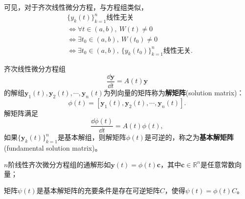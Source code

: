 可见，对于齐次线性微分方程，与方程组类似，
\begin{align}
    &\{y_k(t)\}_{k=1}^n\text{线性无关}\nonumber\\
    &\iff \forall t\in(a,b),\ W(t)\neq 0\nonumber\\
    &\iff \exists t_0\in(a,b),\ W(t_0)\neq 0\nonumber\\
    &\iff \exists t_0\in(a,b),\ \{y_k(t_0)\}_{k=1}^n\text{线性无关}.
\end{align}

\begin{definition}[解矩阵]
    齐次线性微分方程组
    \begin{equation}
        \frac{\dd\mathbf{y}}{\dd t}=A(t)\mathbf{y}
    \end{equation}
    的解组$\mathbf{y}_1(t),\mathbf{y}_2(t),\cdots,\mathbf{y}_n(t)$为列向量的矩阵称为\textbf{解矩阵}(solution matrix)：
    \begin{equation}
        \phi(t)=[\mathbf{y}_1(t),\mathbf{y}_2(t),\cdots,\mathbf{y}_n(t)].
    \end{equation}
    解矩阵满足
    \begin{equation}
        \frac{\dd\phi(t)}{\dd t}=A(t)\phi(t),
    \end{equation}
    如果$\{\mathbf{y}_k(t)\}_{k=1}^n$是基本解组，则解矩阵$\phi(t)$是可逆的，称之为\textbf{基本解矩阵}(fundamental solution matrix)。
\end{definition}
\begin{proposition}
    $n$阶线性齐次微分方程组的通解形如$\mathbf{y}(t)=\phi(t)\mathbf{c}$，其中$\mathbf{c}\in\mathbb{R}^n$是任意常数向量；

    矩阵$\psi(t)$是基本解矩阵的充要条件是存在可逆矩阵$C$，使得$\psi(t)=\phi(t)C$。
\end{proposition}


